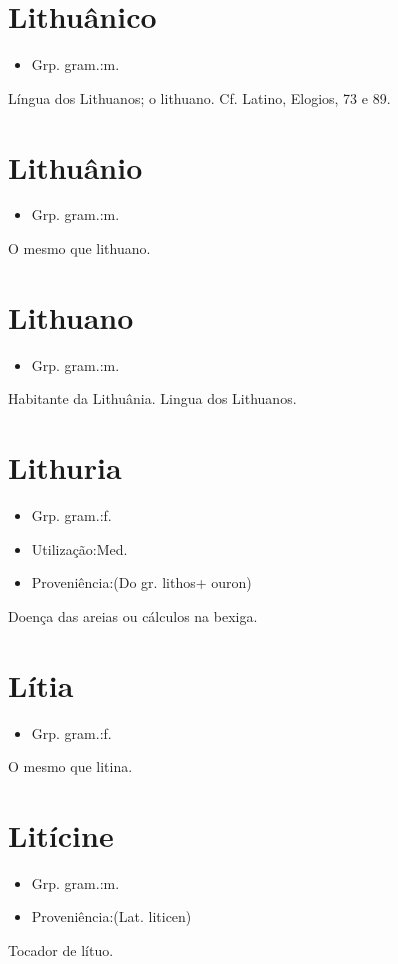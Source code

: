 \section{Lithuânico}
\begin{itemize}
\item {Grp. gram.:m.}
\end{itemize}
Língua dos Lithuanos; o lithuano. Cf. Latino, \textunderscore Elogios\textunderscore , 73 e 89.
\section{Lithuânio}
\begin{itemize}
\item {Grp. gram.:m.}
\end{itemize}
O mesmo que \textunderscore lithuano\textunderscore .
\section{Lithuano}
\begin{itemize}
\item {Grp. gram.:m.}
\end{itemize}
Habitante da Lithuânia.
Lingua dos Lithuanos.
\section{Lithuria}
\begin{itemize}
\item {Grp. gram.:f.}
\end{itemize}
\begin{itemize}
\item {Utilização:Med.}
\end{itemize}
\begin{itemize}
\item {Proveniência:(Do gr. \textunderscore lithos\textunderscore  + \textunderscore ouron\textunderscore )}
\end{itemize}
Doença das areias ou cálculos na bexiga.
\section{Lítia}
\begin{itemize}
\item {Grp. gram.:f.}
\end{itemize}
O mesmo que \textunderscore litina\textunderscore .
\section{Litícine}
\begin{itemize}
\item {Grp. gram.:m.}
\end{itemize}
\begin{itemize}
\item {Proveniência:(Lat. \textunderscore liticen\textunderscore )}
\end{itemize}
Tocador de lítuo.
